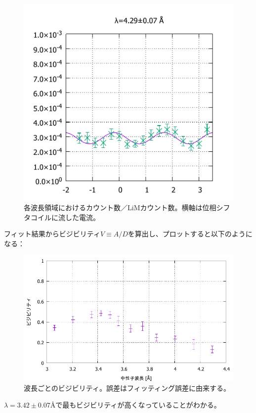 \begin{figure}[H]
\begin{minipage}{0.33\hsize}
\includegraphics[width=\imgwidth]{phase_shifter/wl/wlf8.pdf}
\end{minipage}
\caption{各波長領域におけるカウント数／LiMカウント数。横軸は位相シフタコイルに流した電流。}
\end{figure}

フィット結果からビジビリティ$V\equiv A/D$を算出し、プロットすると以下のようになる：
\begin{figure}[H]
\centering
\includegraphics{phase_shifter/visibility.pdf}
\caption{波長ごとのビジビリティ。誤差はフィッティング誤差に由来する。}
\end{figure}

$\lambda=3.42\pm0.07$Åで最もビジビリティが高くなっていることがわかる。

